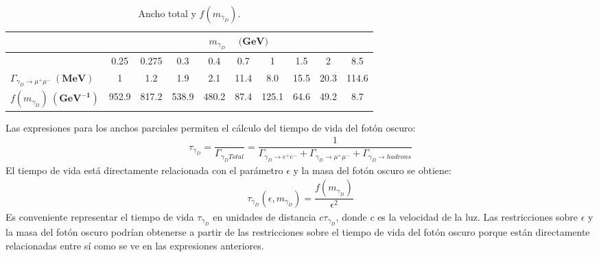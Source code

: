 \begin{table}[!ht]
  \begin{center}
    \label{an-15-455:tb1}
    \small
    \begin{tabular}{l|c|c|c|c|c|c|c|c|c} %
		\toprule
		& \multicolumn{9}{c}{$m_{\gamma_D}$ ~ $\mathbf{(GeV})$}\\
		\hline
		& 0.25 & 0.275 & 0.3 & 0.4 & 0.7 & 1 & 1.5 & 2 & 8.5\\
		\midrule
       	$\Gamma_{\gamma_D \rightarrow \mu^+\mu^-} ~ \mathbf{(MeV)}$ & 1 & 1.2 & 1.9 & 2.1 & 11.4 & 8.0 & 15.5 & 20.3 & 114.6 \\
       	\hline 
       	$f(m_{\gamma_D}) ~ \mathbf{(GeV^{-1})}$ & 952.9 & 817.2 & 538.9 & 480.2 & 87.4 & 125.1 & 64.6 & 49.2 & 8.7 \\
      	\bottomrule    
    \end{tabular}
    \caption{Ancho total y $f(m_{\gamma_D})$.}
  \end{center}
\end{table}

Las expresiones para los anchos parciales permiten el cálculo del tiempo de vida del fotón oscuro:
\begin{eqnarray}
\label{an-15-455:ec6}
\tau_{\gamma_D} = \dfrac{}{\Gamma_{\gamma_D Total}} =\dfrac{1}{\Gamma_{\gamma_D \rightarrow e^+ e^-} + \Gamma_{\gamma_D \rightarrow \mu^+ \mu^-} + \Gamma_{\gamma_D \rightarrow hadrons }}
\end{eqnarray}
El tiempo de vida está directamente relacionada con el parámetro $\epsilon$ y la masa del fotón oscuro se obtiene:
\begin{eqnarray}
\label{an-15-455:ec7}
\tau_{\gamma_D}(\epsilon,m_{\gamma_D}) =\dfrac{f(m_{\gamma_D})}{\epsilon^2} 
\end{eqnarray}
Es conveniente representar el tiempo de vida $\tau_{\gamma_D}$ en unidades de distancia $c\tau_{\gamma_D}$, donde $c$ es la velocidad de la luz. %
Las restricciones sobre $\epsilon$ y la masa del fotón oscuro podrían obtenerse a partir de las restricciones sobre el tiempo de vida del fotón oscuro porque están directamente relacionadas entre sí como se ve en las expresiones anteriores.


